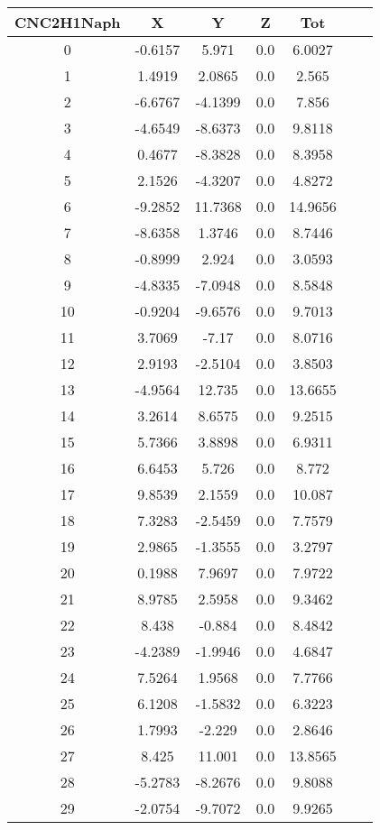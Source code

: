 \begin{table}
\tiny
\centering
   \begin{tabular}{ccccccc}
    \hline
CNC2H1Naph & X & Y & Z & Tot  \\
\hline
0 & -0.6157 & 5.971 & 0.0 & 6.0027 \\ 
1 & 1.4919 & 2.0865 & 0.0 & 2.565 \\ 
2 & -6.6767 & -4.1399 & 0.0 & 7.856 \\ 
3 & -4.6549 & -8.6373 & 0.0 & 9.8118 \\ 
4 & 0.4677 & -8.3828 & 0.0 & 8.3958 \\ 
5 & 2.1526 & -4.3207 & 0.0 & 4.8272 \\ 
6 & -9.2852 & 11.7368 & 0.0 & 14.9656 \\ 
7 & -8.6358 & 1.3746 & 0.0 & 8.7446 \\ 
8 & -0.8999 & 2.924 & 0.0 & 3.0593 \\ 
9 & -4.8335 & -7.0948 & 0.0 & 8.5848 \\ 
10 & -0.9204 & -9.6576 & 0.0 & 9.7013 \\ 
11 & 3.7069 & -7.17 & 0.0 & 8.0716 \\ 
12 & 2.9193 & -2.5104 & 0.0 & 3.8503 \\ 
13 & -4.9564 & 12.735 & 0.0 & 13.6655 \\ 
14 & 3.2614 & 8.6575 & 0.0 & 9.2515 \\ 
15 & 5.7366 & 3.8898 & 0.0 & 6.9311 \\ 
16 & 6.6453 & 5.726 & 0.0 & 8.772 \\ 
17 & 9.8539 & 2.1559 & 0.0 & 10.087 \\ 
18 & 7.3283 & -2.5459 & 0.0 & 7.7579 \\ 
19 & 2.9865 & -1.3555 & 0.0 & 3.2797 \\ 
20 & 0.1988 & 7.9697 & 0.0 & 7.9722 \\ 
21 & 8.9785 & 2.5958 & 0.0 & 9.3462 \\ 
22 & 8.438 & -0.884 & 0.0 & 8.4842 \\ 
23 & -4.2389 & -1.9946 & 0.0 & 4.6847 \\ 
24 & 7.5264 & 1.9568 & 0.0 & 7.7766 \\ 
25 & 6.1208 & -1.5832 & 0.0 & 6.3223 \\ 
26 & 1.7993 & -2.229 & 0.0 & 2.8646 \\ 
27 & 8.425 & 11.001 & 0.0 & 13.8565 \\ 
28 & -5.2783 & -8.2676 & 0.0 & 9.8088 \\ 
29 & -2.0754 & -9.7072 & 0.0 & 9.9265 \\ 

\end{tabular}
\end{table}
